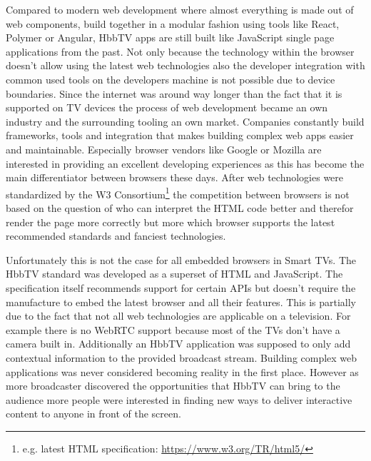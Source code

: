 Compared to modern web development where almost everything is made out of web components, build together in a
modular fashion using tools like React, Polymer or Angular, HbbTV apps are still built like JavaScript single
page applications from the past. Not only because the technology within the browser doesn't allow using the
latest web technologies also the developer integration with common used tools on the developers machine is not
possible due to device boundaries. Since the internet was around way longer than the fact that it is supported on
TV devices the process of web development became an own industry and the surrounding tooling an own market.
Companies constantly build frameworks, tools and integration that makes building complex web apps easier and
maintainable. Especially browser vendors like Google or Mozilla are interested in providing an excellent
developing experiences as this has become the main differentiator between browsers these days. After web
technologies were standardized by the W3 Consortium\footnote{e.g. latest HTML specification: \url{https://www.w3.org/TR/html5/}}
the competition between browsers is not based on the question of who can interpret the HTML code better and therefor
render the page more correctly but more which browser supports the latest recommended standards and fanciest
technologies.

Unfortunately this is not the case for all embedded browsers in Smart TVs. The HbbTV standard was developed as
a superset of HTML and JavaScript. The specification itself recommends support for certain APIs but doesn't
require the manufacture to embed the latest browser and all their features. This is partially due to the fact
that not all web technologies are applicable on a television. For example there is no WebRTC support because
most of the TVs don't have a camera built in. Additionally an HbbTV application was supposed to only add contextual
information to the provided broadcast stream. Building complex web applications was never considered becoming
reality in the first place. However as more broadcaster discovered the opportunities that HbbTV can bring to
the audience more people were interested in finding new ways to deliver interactive content to anyone in
front of the screen.

